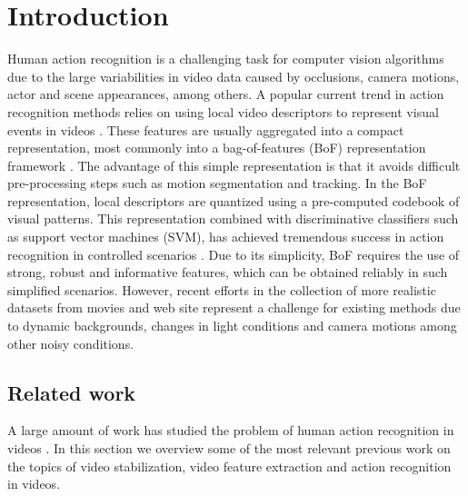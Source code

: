 \section{Introduction}
\label{introduction}

Human action recognition is a challenging task for computer vision algorithms due to the large variabilities in video data caused by occlusions,
camera motions, actor and scene appearances, among others. A popular current trend in action recognition methods relies on using local video
descriptors to represent visual events in videos \cite{Dollar2005, Laptev2005, WangCVPR2011}. These features are usually aggregated into
a compact representation, most commonly into a bag-of-features (BoF) representation framework \cite{Schuldt2004}. The advantage of this
simple representation is that it avoids difficult pre-processing steps such as motion segmentation and tracking.
In the BoF representation, local descriptors are quantized using a pre-computed codebook of visual patterns. This representation combined
with discriminative classifiers such as support vector machines (SVM), has achieved tremendous success in action recognition in controlled
scenarios \cite{Blank2005,Schuldt2004}. Due to its simplicity, BoF requires the use of strong, robust and informative features, which can be 
obtained reliably in such simplified scenarios. However, recent efforts in the collection of more realistic datasets from movies and web site 
\cite{Kuehne2011,Marszalek2009,Rodriguez2008} represent a challenge for existing methods due to dynamic backgrounds, changes in light 
conditions and camera motions among other noisy conditions. 

\subsection{Related work}
A large amount of work has studied the problem of human action recognition in videos \cite{Aggarwal2011}. In
this section we overview some of the most relevant previous work on the topics of video stabilization, video
feature extraction and action recognition in videos.

